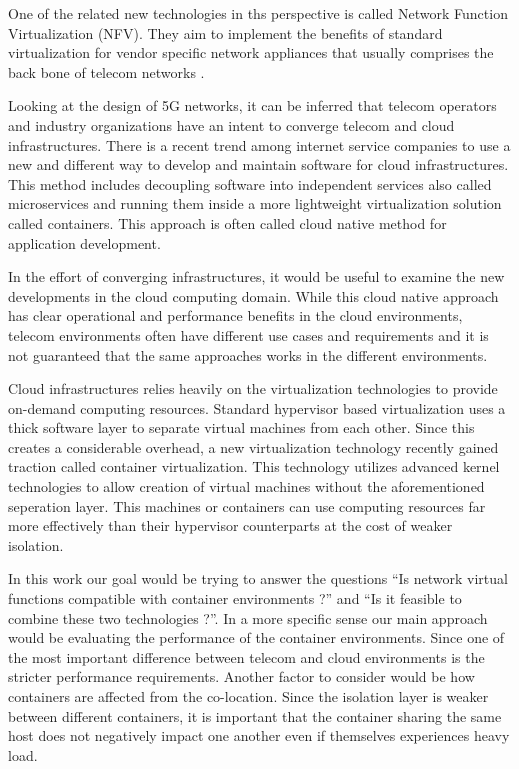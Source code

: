 \documentclass[12pt,oneandhalf,chaparabic,ceng,ms,eng,oneside,pntc]{gsufbe}
\begin{document}
One of the related new technologies in ths perspective is called Network Function Virtualization (NFV).
They aim to implement the benefits of standard virtualization for vendor specific network appliances that usually
comprises the back bone of telecom networks \cite{abdelwahab_network_2016}.

Looking at the design of 5G networks, it can be inferred that telecom operators and industry organizations
have an intent to converge telecom and cloud infrastructures.  There is a recent trend among internet
service companies to use a new and different way to develop and maintain
software for cloud infrastructures.  This method includes decoupling software into independent services
also called microservices and running them inside a more lightweight virtualization solution called
containers.  This approach is often called cloud native method for application development.

In the effort of converging infrastructures, it would be useful to examine the new developments in the
cloud computing domain. While this cloud native approach has clear operational and performance benefits
in the cloud environments, telecom environments often have different use cases and requirements and
it is not guaranteed that the same approaches works in the different environments.

Cloud infrastructures relies heavily on the virtualization technologies to provide on-demand computing
resources. Standard hypervisor based virtualization uses a thick software layer to separate virtual
machines from each other. Since this creates a considerable overhead, a new virtualization
technology recently gained traction called container virtualization. This technology utilizes advanced
kernel technologies to allow creation of virtual machines without the aforementioned seperation layer.
This machines or containers can use computing resources far more effectively than their hypervisor
counterparts at the cost of weaker isolation.

In this work our goal would be trying to answer the questions ``Is network virtual functions
compatible with container environments ?'' and ``Is it feasible to combine these two technologies ?''.
In a more specific sense our main approach would be evaluating the performance of the container
environments. Since one of the most important difference between telecom and cloud environments is the
stricter performance requirements. Another factor to consider would be how containers are affected from
the co-location. Since the isolation layer is weaker between different containers, it is important that
the container sharing the same host does not negatively impact one another even if themselves experiences
heavy load.
\end{document}
